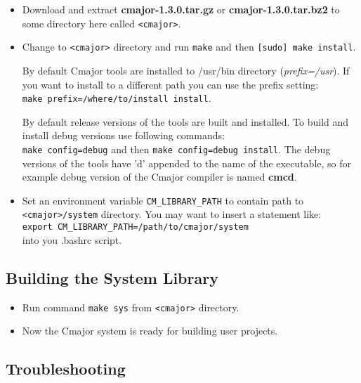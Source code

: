 \documentclass[oneside, a4paper, 11pt]{article}
\begin{document}
\begin{itemize}

\item
Download and extract \textbf{cmajor-1.3.0.tar.gz} or \textbf{cmajor-1.3.0.tar.bz2}
to some directory here called \verb|<cmajor>|.

\item
Change to \verb|<cmajor>| directory and run \verb|make| and then \verb|[sudo] make install|.

By default Cmajor tools are installed to /usr/bin directory (\emph{prefix=/usr}).
If you want to install to a different path you can use the prefix setting:\\
\verb|make prefix=/where/to/install install|.

By default release versions of the tools are built and installed.
To build and install debug versions use following commands:\\
\verb|make config=debug| and then \verb|make config=debug install|.
The debug versions of the tools have 'd' appended to the name of the executable, so
for example debug version of the Cmajor compiler is named \textbf{cmcd}.

\item
Set an environment variable \verb|CM_LIBRARY_PATH| to contain path to \verb|<cmajor>/system| directory.
You may want to insert a statement like:\\
\verb|export CM_LIBRARY_PATH=/path/to/cmajor/system|\\
into you .bashrc script.

\end{itemize}

\subsection{Building the System Library}

\begin{itemize}

\item
Run command \verb|make sys| from \verb|<cmajor>| directory.

\item
Now the Cmajor system is ready for building user projects.

\end{itemize}

\subsection{Troubleshooting}
\end{document}
